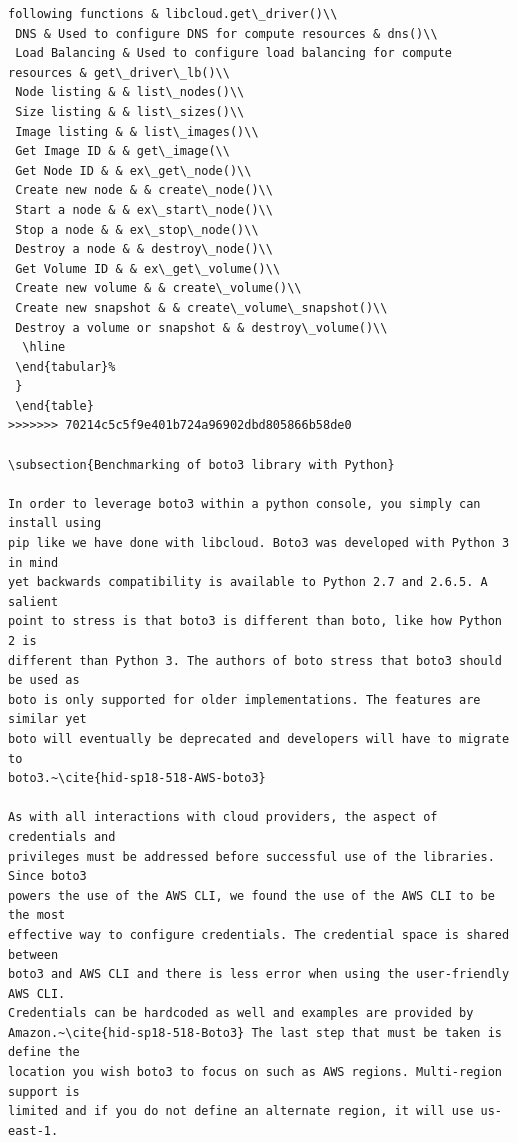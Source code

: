 \begin{verbatim}
following functions	& libcloud.get\_driver()\\
 DNS & Used to configure DNS for compute resources & dns()\\
 Load Balancing & Used to configure load balancing for compute resources & get\_driver\_lb()\\
 Node listing & & list\_nodes()\\
 Size listing & & list\_sizes()\\
 Image listing & & list\_images()\\
 Get Image ID & & get\_image(\\
 Get Node ID & & ex\_get\_node()\\
 Create new node & & create\_node()\\
 Start a node & & ex\_start\_node()\\
 Stop a node & & ex\_stop\_node()\\
 Destroy a node & & destroy\_node()\\
 Get Volume ID & & ex\_get\_volume()\\
 Create new volume & & create\_volume()\\
 Create new snapshot & & create\_volume\_snapshot()\\
 Destroy a volume or snapshot & & destroy\_volume()\\
  \hline
 \end{tabular}%
 }
 \end{table}
>>>>>>> 70214c5c5f9e401b724a96902dbd805866b58de0

\subsection{Benchmarking of boto3 library with Python}

In order to leverage boto3 within a python console, you simply can install using
pip like we have done with libcloud. Boto3 was developed with Python 3 in mind
yet backwards compatibility is available to Python 2.7 and 2.6.5. A salient
point to stress is that boto3 is different than boto, like how Python 2 is
different than Python 3. The authors of boto stress that boto3 should be used as
boto is only supported for older implementations. The features are similar yet
boto will eventually be deprecated and developers will have to migrate to
boto3.~\cite{hid-sp18-518-AWS-boto3}

As with all interactions with cloud providers, the aspect of credentials and
privileges must be addressed before successful use of the libraries. Since boto3
powers the use of the AWS CLI, we found the use of the AWS CLI to be the most
effective way to configure credentials. The credential space is shared between
boto3 and AWS CLI and there is less error when using the user-friendly AWS CLI.
Credentials can be hardcoded as well and examples are provided by
Amazon.~\cite{hid-sp18-518-Boto3} The last step that must be taken is define the
location you wish boto3 to focus on such as AWS regions. Multi-region support is
limited and if you do not define an alternate region, it will use us-east-1.


\end{verbatim}
